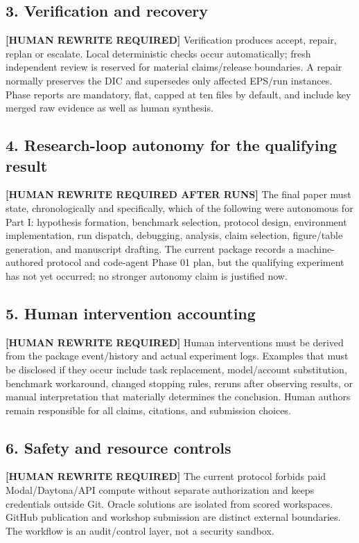 \documentclass{article}
\begin{document}
\subsection*{3. Verification and recovery}
\textbf{[HUMAN REWRITE REQUIRED]} Verification produces accept, repair, replan or escalate. Local deterministic checks occur automatically; fresh independent review is reserved for material claims/release boundaries. A repair normally preserves the DIC and supersedes only affected EPS/run instances. Phase reports are mandatory, flat, capped at ten files by default, and include key merged raw evidence as well as human synthesis.

\subsection*{4. Research-loop autonomy for the qualifying result}
\textbf{[HUMAN REWRITE REQUIRED AFTER RUNS]} The final paper must state, chronologically and specifically, which of the following were autonomous for Part I: hypothesis formation, benchmark selection, protocol design, environment implementation, run dispatch, debugging, analysis, claim selection, figure/table generation, and manuscript drafting. The current package records a machine-authored protocol and code-agent Phase 01 plan, but the qualifying experiment has not yet occurred; no stronger autonomy claim is justified now.

\subsection*{5. Human intervention accounting}
\textbf{[HUMAN REWRITE REQUIRED]} Human interventions must be derived from the package event/history and actual experiment logs. Examples that must be disclosed if they occur include task replacement, model/account substitution, benchmark workaround, changed stopping rules, reruns after observing results, or manual interpretation that materially determines the conclusion. Human authors remain responsible for all claims, citations, and submission choices.

\subsection*{6. Safety and resource controls}
\textbf{[HUMAN REWRITE REQUIRED]} The current protocol forbids paid Modal/Daytona/API compute without separate authorization and keeps credentials outside Git. Oracle solutions are isolated from scored workspaces. GitHub publication and workshop submission are distinct external boundaries. The workflow is an audit/control layer, not a security sandbox.
\end{document}
